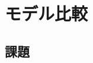 \documentclass{ltjsbook}
\begin{document}
 
\chapter{モデル比較}
\label{chapter30} 


\section{課題}
\end{document}
